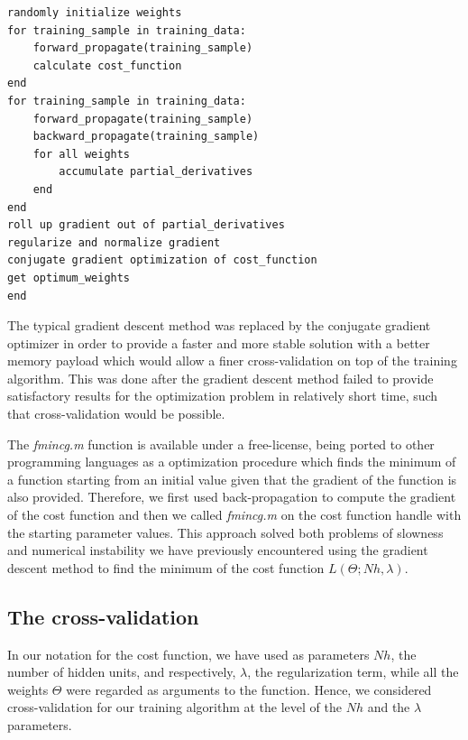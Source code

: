 \documentclass[a4paper,10pt]{article}
\begin{document}
\begin{verbatim}
randomly initialize weights
for training_sample in training_data:
    forward_propagate(training_sample)
    calculate cost_function
end
for training_sample in training_data:
    forward_propagate(training_sample)
    backward_propagate(training_sample)
    for all weights
        accumulate partial_derivatives
    end
end
roll up gradient out of partial_derivatives
regularize and normalize gradient
conjugate gradient optimization of cost_function
get optimum_weights
end
\end{verbatim}

The typical gradient descent method was replaced by the conjugate gradient optimizer in order to provide a faster and more stable solution with a better memory payload which would allow a finer cross-validation on top of the training algorithm. This was done after the gradient descent method failed to provide satisfactory results for the optimization problem in relatively short time, such that cross-validation would be possible.

The \textit{fmincg.m} function is available under a free-license, being ported to other programming languages  as a optimization procedure which finds the minimum of a function starting from an initial value given that the gradient of the function is also provided. Therefore, we first used back-propagation to compute the gradient of the cost function and then we called \textit{fmincg.m} on the cost function handle with the starting parameter values. This approach solved both problems of slowness and numerical instability we have previously encountered using the gradient descent method to find the minimum of the cost function $L(\Theta;Nh,\lambda)$.

\subsection{The cross-validation}
In our notation for the cost function, we have used as parameters $Nh$, the number of hidden units, and respectively, $\lambda$, the regularization term, while all the weights $\Theta$ were regarded as arguments to the function. Hence, we considered cross-validation for our training algorithm at the level of the $Nh$ and the $\lambda$ parameters.
\end{document}
